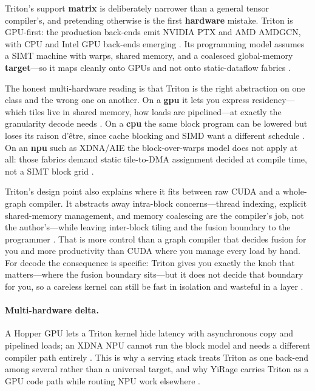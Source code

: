 Triton's support \textbf{matrix} is deliberately narrower than a general tensor compiler's, and pretending otherwise is the first \textbf{hardware} mistake. Triton is GPU-first: the production back-ends emit NVIDIA PTX and AMD AMDGCN, with CPU and Intel GPU back-ends emerging \citep{tritonlang2024}. Its programming model assumes a SIMT machine with warps, shared memory, and a coalesced global-memory \textbf{target}---so it maps cleanly onto GPUs and not onto static-dataflow fabrics \citep{nvidia2022hopper,tillet2019triton}.

The honest multi-hardware reading is that Triton is the right abstraction on one class and the wrong one on another. On a \textbf{gpu} it lets you express residency---which tiles live in shared memory, how loads are pipelined---at exactly the granularity decode needs \citep{tillet2019triton,memoryfloor2026}. On a \textbf{cpu} the same block program can be lowered but loses its raison d'\^etre, since cache blocking and SIMD want a different schedule \citep{dlbook}. On an \textbf{npu} such as XDNA/AIE the block-over-warps model does not apply at all: those fabrics demand static tile-to-DMA assignment decided at compile time, not a SIMT block grid \citep{amd2024xdna,amd2024aie}.

Triton's design point also explains where it fits between raw CUDA and a whole-graph compiler. It abstracts away intra-block concerns---thread indexing, explicit shared-memory management, and memory coalescing are the compiler's job, not the author's---while leaving inter-block tiling and the fusion boundary to the programmer \citep{tillet2019triton}. That is more control than a graph compiler that decides fusion for you and more productivity than CUDA where you manage every load by hand. For decode the consequence is specific: Triton gives you exactly the knob that matters---where the fusion boundary sits---but it does not decide that boundary for you, so a careless kernel can still be fast in isolation and wasteful in a layer \citep{taxbreak2026,memoryfloor2026}.

\paragraph{Multi-hardware delta.} A Hopper GPU lets a Triton kernel hide latency with asynchronous copy and pipelined loads; an XDNA NPU cannot run the block model and needs a different compiler path entirely \citep{semianalysis2024tma,amd2024aie}. This is why a serving stack treats Triton as one back-end among several rather than a universal target, and why YiRage carries Triton as a GPU code path while routing NPU work elsewhere \citep{yirage2026}.

